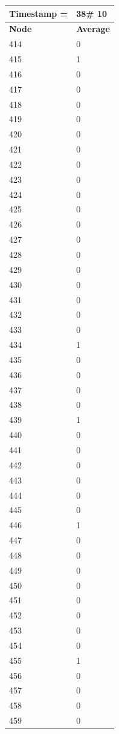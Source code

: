 \begin{tabular}{|l||l|}
\hline
\textbf{Timestamp =} & \textbf{38}\# 10\\\hline
	\textbf{Node} & \textbf{Average} \\ \hline
\hline
	414 & 0 \\ \hline
	415 & 1 \\ \hline
	416 & 0 \\ \hline
	417 & 0 \\ \hline
	418 & 0 \\ \hline
	419 & 0 \\ \hline
	420 & 0 \\ \hline
	421 & 0 \\ \hline
	422 & 0 \\ \hline
	423 & 0 \\ \hline
	424 & 0 \\ \hline
	425 & 0 \\ \hline
	426 & 0 \\ \hline
	427 & 0 \\ \hline
	428 & 0 \\ \hline
	429 & 0 \\ \hline
	430 & 0 \\ \hline
	431 & 0 \\ \hline
	432 & 0 \\ \hline
	433 & 0 \\ \hline
	434 & 1 \\ \hline
	435 & 0 \\ \hline
	436 & 0 \\ \hline
	437 & 0 \\ \hline
	438 & 0 \\ \hline
	439 & 1 \\ \hline
	440 & 0 \\ \hline
	441 & 0 \\ \hline
	442 & 0 \\ \hline
	443 & 0 \\ \hline
	444 & 0 \\ \hline
	445 & 0 \\ \hline
	446 & 1 \\ \hline
	447 & 0 \\ \hline
	448 & 0 \\ \hline
	449 & 0 \\ \hline
	450 & 0 \\ \hline
	451 & 0 \\ \hline
	452 & 0 \\ \hline
	453 & 0 \\ \hline
	454 & 0 \\ \hline
	455 & 1 \\ \hline
	456 & 0 \\ \hline
	457 & 0 \\ \hline
	458 & 0 \\ \hline
	459 & 0 \\ \hline
\end{tabular}
